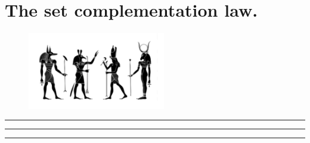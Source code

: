 \documentclass[preview]{standalone}
\begin{document}
\section{The set complementation law.}

\begin{figure}[!h]
    \centering
    \includegraphics[width=6cm]{../resources/jpg/2.2.set.operations/set.jpg}
\end{figure}
\pagebreak



\pagebreak



%
\begin{center} \color{lightgray}
    \rule{5.4in}{0.1pt}
\end{center}



%
\pagebreak



%
\begin{center} \color{lightgray}
    \rule{5.4in}{0.1pt}
\end{center}



%
\begin{center} \color{lightgray}
    \rule{5.4in}{0.1pt}
\end{center}



%
\pagebreak
\end{document}

